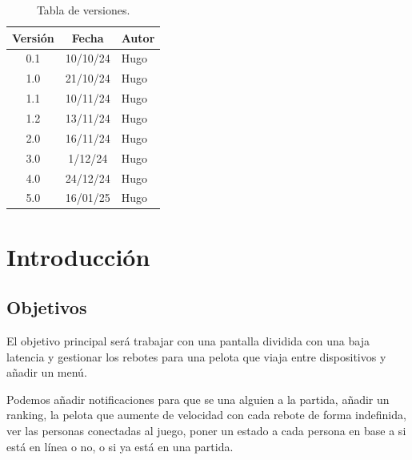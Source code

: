 \documentclass[a4paper,openright,12pt]{article}
\begin{document}

\tableofcontents

\vspace{5cm}

\begin{flushright}
\begin{table}[hbtp]
\begin{center}

\caption{Tabla de versiones.}
\label{tabla:versiones}
\small
\vspace{1ex}

\begin{tabular}{|c|c|l|}
\hline
Versión & Fecha & Autor \\
\hline \hline
0.1 & 10/10/24 & Hugo\\ \hline
1.0 & 21/10/24 & Hugo\\ \hline
1.1 & 10/11/24 & Hugo\\ \hline
1.2 & 13/11/24 & Hugo\\ \hline
2.0 & 16/11/24 & Hugo\\ \hline
3.0 &  1/12/24 & Hugo\\ \hline
4.0 & 24/12/24 & Hugo\\ \hline
5.0 & 16/01/25 & Hugo\\ \hline

\end{tabular}

\end{center}
\end{table}
\end{flushright}

\newpage
{}


\section{Introducción}\label{cap.introduccion}

\subsection{Objetivos}
El objetivo principal será trabajar con una pantalla dividida con una baja latencia y gestionar los rebotes para una pelota que viaja entre dispositivos y añadir un menú.

Podemos añadir notificaciones para que se una alguien a la partida, añadir un ranking, la pelota que aumente de velocidad con cada rebote de forma indefinida, ver las personas conectadas al juego, poner un estado a cada persona en base a si está en línea o no, o si ya está en una partida.
\end{document}
